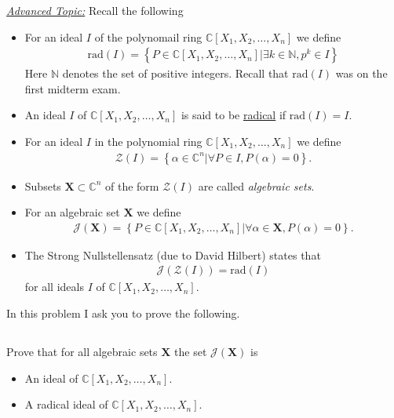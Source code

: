 \documentclass[10pt]{amsart}
\newcommand{\N}{\mathbb{N}}
\newcommand{\C}{\mathbb{C}}
\newcommand{\rad}[1]{\text{rad}\left(#1\right)}
\begin{document}
\underline{\textit{Advanced Topic:}} Recall the following
\begin{itemize}
  \item For an ideal $I$ of the polynomail ring $\C[X_1,X_2,\ldots,X_n]$ we
    define
    \begin{align*}
      \rad{I}=\left\{P\in\C[X_1,X_2,\ldots,X_n]|\exists k\in\N,p^k\in I\right\}
    \end{align*}
    Here $\N$ denotes the set of positive integers. Recall that $\rad{I}$ was
    on the first midterm exam.

  \item An ideal $I$ of $\C[X_1,X_2,\ldots,X_n]$ is said to be
    \underline{radical} if $\rad{I}=I$.

  \item For an ideal $I$ in the polynomial ring $\C[X_1,X_2,\ldots,X_n]$ we
    define
    \begin{align*}
      \mathscr{Z}(I)=\left\{\alpha\in\C^n\vert\forall P\in
        I,P(\alpha)=0\right\}.
    \end{align*}

  \item Subsets $\mathbf{X}\subset \C^n$ of the form $\mathscr{Z}(I)$ are called
    \textit{algebraic sets}.

  \item For an algebraic set $\mathbf{X}$ we define
    \begin{align*}
      \mathscr{J}(\mathbf{X})=\left\{P\in\C[X_1,X_2,\ldots,X_n]\vert\forall
        \alpha\in\mathbf{X},P(\alpha)=0\right\}.
    \end{align*}

  \item The Strong Nullstellensatz (due to David Hilbert) states that
    \begin{align*}
      \mathscr{J}(\mathscr{Z}(I))=\rad{I}
    \end{align*}
    for all ideals $I$ of $\C[X_1,X_2,\ldots,X_n]$.
\end{itemize}
In this problem I ask you to prove the following.

\subsection{}%
\label{sub:4a}

Prove that for all algebraic sets $\mathbf{X}$ the set
$\mathscr{J}(\mathbf{X})$ is
\begin{itemize}
  \item An ideal of $\C[X_1,X_2,\ldots,X_n]$.
  \item A radical ideal of $\C[X_1,X_2,\ldots,X_n]$.
\end{itemize}
\end{document}
